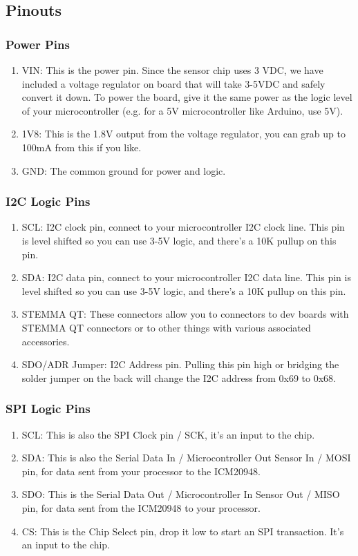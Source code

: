 \documentclass[11pt, oneside]{article}   	%
\begin{document}
\subsection{Pinouts}
\subsubsection{Power Pins}
\begin{enumerate}
\item VIN: This is the power pin. Since the sensor chip uses 3 VDC, we have included a voltage regulator on board that will take 3-5VDC and safely convert it down. To power the board, give it the same power as the logic level of your microcontroller (e.g. for a 5V microcontroller like Arduino, use 5V).
\item 1V8: This is the 1.8V output from the voltage regulator, you can grab up to 100mA from this if you like.
\item GND: The common ground for power and logic.
\end{enumerate}

\subsubsection{I2C Logic Pins}
\begin{enumerate}
\item SCL: I2C clock pin, connect to your microcontroller I2C clock line. This pin is level shifted so you can use 3-5V logic, and there's a 10K pullup on this pin.
\item SDA: I2C data pin, connect to your microcontroller I2C data line. This pin is level shifted so you can use 3-5V logic, and there's a 10K pullup on this pin.
\item STEMMA QT: These connectors allow you to connectors to dev boards with STEMMA QT connectors or to other things with various associated accessories.
\item SDO/ADR Jumper: I2C Address pin. Pulling this pin high or bridging the solder jumper on the back will change the I2C address from 0x69 to 0x68.
\end{enumerate}

\subsubsection{SPI Logic Pins}
\begin{enumerate}
\item SCL: This is also the SPI Clock pin / SCK, it's an input to the chip.
\item SDA: This is also the Serial Data In / Microcontroller Out Sensor In / MOSI pin, for data sent from your processor to the ICM20948.
\item SDO: This is the Serial Data Out / Microcontroller In Sensor Out / MISO pin, for data sent from the ICM20948 to your processor. 
\item CS: This is the Chip Select pin, drop it low to start an SPI transaction. It's an input to the chip.
\end{enumerate}
\end{document}
